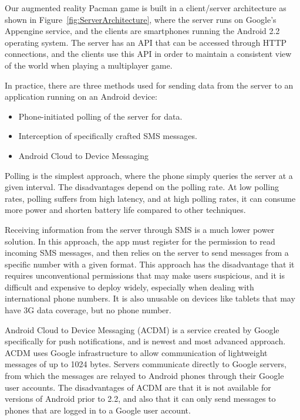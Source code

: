 \documentclass{acm_proc_article-sp}
\begin{document}
Our augmented reality Pacman game is built in a client/server architecture as
shown in Figure~\ref{fig:ServerArchitecture}, where the server runs on Google's
Appengine service, and the clients are smartphones running the Android 2.2
operating system.  The server has an API that can be accessed through HTTP
connections, and the clients use this API in order to maintain a consistent
view of the world when playing a multiplayer game.

In practice, there are three methods used for sending data from the server to
an application running on an Android device:
\begin{itemize}
\item Phone-initiated polling of the server for data.
\item Interception of specifically crafted SMS messages.
\item Android Cloud to Device Messaging
\end{itemize}

Polling is the simplest approach, where the phone simply queries the server at
a given interval. The disadvantages depend on the polling rate. At low polling
rates, polling suffers from high latency, and at high polling rates, it can
consume more power and shorten battery life compared to other techniques.

Receiving information from the server through SMS is a much lower power
solution. In this approach, the app must register for the permission to read
incoming SMS messages, and then relies on the server to send messages from a
specific number with a given format. This approach has the disadvantage that it
requires unconventional permissions that may make users suspicious, and it is
difficult and expensive to deploy widely, especially when dealing with
international phone numbers. It is also unusable on devices like tablets that
may have 3G data coverage, but no phone number.

Android Cloud to Device Messaging (ACDM) is a service created by Google
specifically for push notifications, and is newest and most advanced approach.
ACDM uses Google infrastructure to allow communication of lightweight messages
of up to 1024 bytes. Servers communicate directly to Google servers, from which
the messages are relayed to Android phones through their Google user accounts.
The disadvantages of ACDM are that it is not available for versions of Android
prior to 2.2, and also that it can only send messages to phones that are logged
in to a Google user account.
\end{document}
